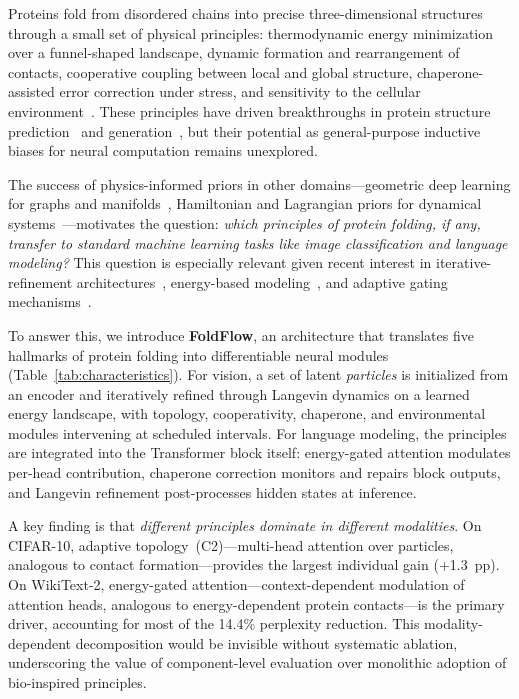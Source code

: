 \documentclass[10pt]{article}
\begin{document}
Proteins fold from disordered chains into precise three-dimensional
structures through a small set of physical principles: thermodynamic
energy minimization over a funnel-shaped landscape, dynamic formation
and rearrangement of contacts, cooperative coupling between local and
global structure, chaperone-assisted error correction under stress, and
sensitivity to the cellular environment~\citep{anfinsen1973, dill2012protein}.
These principles have driven breakthroughs in protein structure
prediction~\citep{jumper2021alphafold, baek2021accurate, lin2023evolutionary}
and generation~\citep{bose2024se3stochastic}, but their potential as
general-purpose inductive biases for neural computation remains unexplored.

The success of physics-informed priors in other domains---geometric deep
learning for graphs and manifolds~\citep{bronstein2021geometric},
Hamiltonian and Lagrangian priors for dynamical
systems~\citep{chen2018neural}---motivates the question:
\emph{which principles of protein folding, if any, transfer to
standard machine learning tasks like image classification and language
modeling?}  This question is especially relevant given recent interest
in iterative-refinement architectures~\citep{dehghani2019universal,
bai2019deep}, energy-based modeling~\citep{lecun2006tutorial,
du2019implicit}, and adaptive gating
mechanisms~\citep{shazeer2017outrageously, fedus2022switch}.

To answer this, we introduce \textbf{FoldFlow}, an architecture that
translates five hallmarks of protein folding into differentiable neural
modules (Table~\ref{tab:characteristics}).  For vision, a set of latent
\emph{particles} is initialized from an encoder and iteratively refined
through Langevin dynamics on a learned energy landscape, with topology,
cooperativity, chaperone, and environmental modules intervening at
scheduled intervals.  For language modeling, the principles are
integrated into the Transformer block itself: energy-gated attention
modulates per-head contribution, chaperone correction monitors and
repairs block outputs, and Langevin refinement post-processes hidden
states at inference.

A key finding is that \emph{different principles dominate in different
modalities}.  On CIFAR-10, adaptive topology~(C2)---multi-head attention
over particles, analogous to contact formation---provides the largest
individual gain (+1.3~pp).  On WikiText-2, energy-gated
attention---context-dependent modulation of attention heads, analogous
to energy-dependent protein contacts---is the primary driver, accounting
for most of the 14.4\% perplexity reduction.  This modality-dependent
decomposition would be invisible without systematic ablation, underscoring
the value of component-level evaluation over monolithic adoption of
bio-inspired principles.
\end{document}
